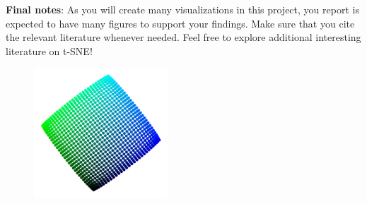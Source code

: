 \documentclass[11pt]{article}
\begin{document}
\textbf{Final notes}: As you will create many visualizations in this project, you report is expected to have many figures to support your findings. Make sure that you cite the relevant literature whenever needed. Feel free to explore additional interesting literature on t-SNE!

\begin{figure}[h!]
\centering\includegraphics[width=5cm]{Images/Task-1-t-SNE.png}
\end{figure}

\newpage



\end{document}
